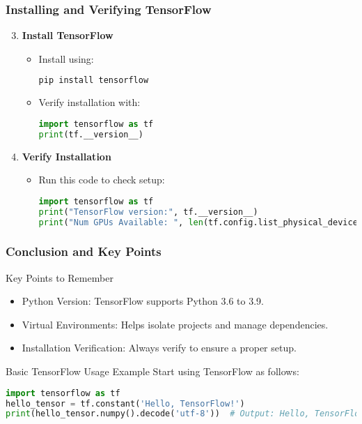\documentclass[aspectratio=169]{beamer}
\begin{document}
\begin{frame}[fragile]
    \frametitle{Installing and Verifying TensorFlow}
    \begin{enumerate}
        \setcounter{enumi}{2}
        \item \textbf{Install TensorFlow}
        \begin{itemize}
            \item Install using:
            \begin{lstlisting}[language=bash]
pip install tensorflow
            \end{lstlisting}
            \item Verify installation with:
            \begin{lstlisting}[language=python]
import tensorflow as tf
print(tf.__version__)
            \end{lstlisting}
        \end{itemize}

        \item \textbf{Verify Installation}
        \begin{itemize}
            \item Run this code to check setup:
            \begin{lstlisting}[language=python]
import tensorflow as tf
print("TensorFlow version:", tf.__version__)
print("Num GPUs Available: ", len(tf.config.list_physical_devices('GPU')))
            \end{lstlisting}
        \end{itemize}
    \end{enumerate}
\end{frame}

\begin{frame}[fragile]
    \frametitle{Conclusion and Key Points}
    \begin{block}{Key Points to Remember}
        \begin{itemize}
            \item Python Version: TensorFlow supports Python 3.6 to 3.9.
            \item Virtual Environments: Helps isolate projects and manage dependencies.
            \item Installation Verification: Always verify to ensure a proper setup.
        \end{itemize}
    \end{block}
    
    \begin{block}{Basic TensorFlow Usage Example}
        Start using TensorFlow as follows:
        \begin{lstlisting}[language=python]
import tensorflow as tf
hello_tensor = tf.constant('Hello, TensorFlow!')
print(hello_tensor.numpy().decode('utf-8'))  # Output: Hello, TensorFlow!
        \end{lstlisting}
    \end{block}
\end{frame}
\end{document}
